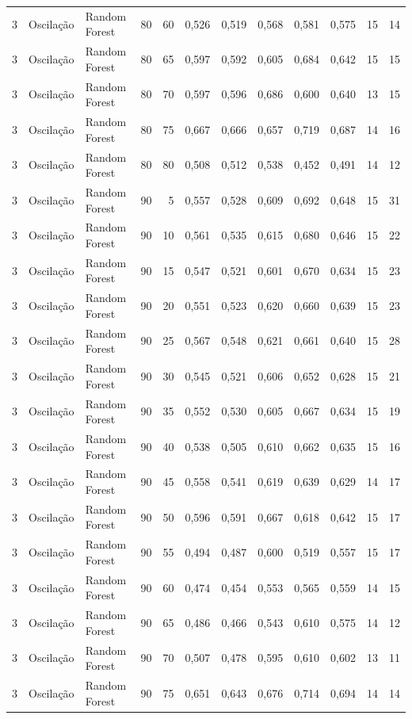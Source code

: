 \begin{longtable}{@{}rllrrrrrrrrr@{}}
3 & Oscilação & Random Forest & 80 & 60 & 0,526 & 0,519 & 0,568 & 0,581 & 0,575 & 15 & 14 \\
3 & Oscilação & Random Forest & 80 & 65 & 0,597 & 0,592 & 0,605 & 0,684 & 0,642 & 15 & 15 \\
3 & Oscilação & Random Forest & 80 & 70 & 0,597 & 0,596 & 0,686 & 0,600 & 0,640 & 13 & 15 \\
3 & Oscilação & Random Forest & 80 & 75 & 0,667 & 0,666 & 0,657 & 0,719 & 0,687 & 14 & 16 \\
3 & Oscilação & Random Forest & 80 & 80 & 0,508 & 0,512 & 0,538 & 0,452 & 0,491 & 14 & 12 \\
3 & Oscilação & Random Forest & 90 & 5 & 0,557 & 0,528 & 0,609 & 0,692 & 0,648 & 15 & 31 \\
3 & Oscilação & Random Forest & 90 & 10 & 0,561 & 0,535 & 0,615 & 0,680 & 0,646 & 15 & 22 \\
3 & Oscilação & Random Forest & 90 & 15 & 0,547 & 0,521 & 0,601 & 0,670 & 0,634 & 15 & 23 \\
3 & Oscilação & Random Forest & 90 & 20 & 0,551 & 0,523 & 0,620 & 0,660 & 0,639 & 15 & 23 \\
3 & Oscilação & Random Forest & 90 & 25 & 0,567 & 0,548 & 0,621 & 0,661 & 0,640 & 15 & 28 \\
3 & Oscilação & Random Forest & 90 & 30 & 0,545 & 0,521 & 0,606 & 0,652 & 0,628 & 15 & 21 \\
3 & Oscilação & Random Forest & 90 & 35 & 0,552 & 0,530 & 0,605 & 0,667 & 0,634 & 15 & 19 \\
3 & Oscilação & Random Forest & 90 & 40 & 0,538 & 0,505 & 0,610 & 0,662 & 0,635 & 15 & 16 \\
3 & Oscilação & Random Forest & 90 & 45 & 0,558 & 0,541 & 0,619 & 0,639 & 0,629 & 14 & 17 \\
3 & Oscilação & Random Forest & 90 & 50 & 0,596 & 0,591 & 0,667 & 0,618 & 0,642 & 15 & 17 \\
3 & Oscilação & Random Forest & 90 & 55 & 0,494 & 0,487 & 0,600 & 0,519 & 0,557 & 15 & 17 \\
3 & Oscilação & Random Forest & 90 & 60 & 0,474 & 0,454 & 0,553 & 0,565 & 0,559 & 14 & 15 \\
3 & Oscilação & Random Forest & 90 & 65 & 0,486 & 0,466 & 0,543 & 0,610 & 0,575 & 14 & 12 \\
3 & Oscilação & Random Forest & 90 & 70 & 0,507 & 0,478 & 0,595 & 0,610 & 0,602 & 13 & 11 \\
3 & Oscilação & Random Forest & 90 & 75 & 0,651 & 0,643 & 0,676 & 0,714 & 0,694 & 14 & 14 \\

\end{longtable}
